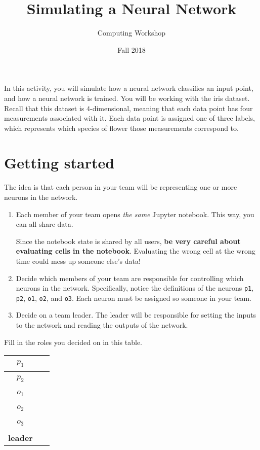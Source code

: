 \documentclass[11pt]{article}
\author{Computing Workshop}
\title{Simulating a Neural Network}
\date{Fall 2018}
\begin{document}
\maketitle

In this activity, you will simulate how a neural network classifies an input
point, and how a neural network is trained. You will be working with the iris
dataset. Recall that this dataset is $4$-dimensional, meaning that each data
point has four measurements associated with it. Each data point is assigned one
of three labels, which represents which species of flower those measurements
correspond to.

\section{Getting started}

The idea is that each person in your team will be representing one or more
neurons in the network.

\begin{enumerate}
\item
  Each member of your team opens \emph{the same} Jupyter notebook.
  This way, you can all share data.

  Since the notebook state is shared by all users,
  \textbf{be very careful about evaluating cells in the notebook}.
  Evaluating the wrong cell at the wrong time could mess up someone else's
  data!

\item
  Decide which members of your team are responsible for controlling which
  neurons in the network. Specifically, notice the definitions of the neurons
  \lstinline!p1!, \lstinline!p2!, \lstinline!o1!, \lstinline!o2!, and
  \lstinline!o3!. Each neuron must be assigned so someone in your team.

\item
  Decide on a team leader. The leader will be responsible for setting the inputs
  to the network and reading the outputs of the network.
\end{enumerate}

Fill in the roles you decided on in this table.

\begin{center}
  \begin{tabular}{| c | p{15em} |}
    \hline
    \textbf{$p_1$} & ~ \\ \hline
    \textbf{$p_2$} & ~ \\ \hline
    \textbf{$o_1$} & ~ \\ \hline
    \textbf{$o_2$} & ~ \\ \hline
    \textbf{$o_3$} & ~ \\ \hline
    \textbf{leader} & ~ \\ \hline
  \end{tabular}
\end{center}
\end{document}

